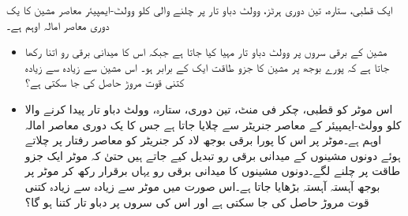 ایک  قطبی، ستارہ، تین دوری  ہرٹز،  وولٹ دباو تار  پر چلنے والی  کلو وولٹ-ایمپیئر  معاصر مشین کا یک دوری  معاصر امالہ  اوہم ہے۔
\begin{itemize}
\item
مشین کے برقی سروں پر  وولٹ دباو تار مہیا کیا جاتا ہے جبکہ اس کا میدانی برقی رو اتنا رکھا جاتا ہے کہ پورے بوجھ پر مشین کا جزو طاقت ایک کے برابر ہو۔ اس مشین سے زیادہ سے زیادہ کتنی قوت مروڑ حاصل کی جا سکتی ہے؟
\item
اس موٹر کو    قطبی،   چکر فی منٹ، تین دوری، ستارہ،   وولٹ دباو تار پیدا کرنے والا   کلو وولٹ-ایمپیئر کے معاصر جنریٹر سے چلایا جاتا ہے جس کا یک دوری معاصر امالہ  اوہم ہے۔موٹر پر اس کا پورا برقی بوجھ لاد  کر جنریٹر کو معاصر رفتار پر چلاتے ہوئے دونوں مشینوں کے میدانی برقی رو تبدیل کیے جاتے ہیں حتیٰ کہ موٹر ایک جزو طاقت پر چلنے لگے۔دونوں مشینوں کا میدانی برقی رو یہاں برقرار رکھ کر موٹر پر بوجھ آہستہ آہستہ بڑھایا جاتا ہے۔اس صورت میں موٹر سے زیادہ سے زیادہ کتنی قوت مروڑ  حاصل کی جا سکتی ہے اور اس کی سروں پر دباو تار کتنا ہو گا؟ 
\end{itemize}

